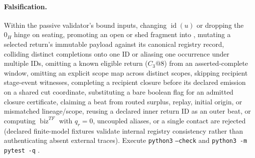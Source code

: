 \paragraph{Falsification.}
Within the passive validator's bound inputs, changing \(\operatorname{id}(u)\)
or dropping the \(0_H\) hinge on seating, promoting an open or shed fragment
into , mutating a selected return's
immutable payload against its canonical registry record, colliding distinct
completions onto one ID or aliasing one occurrence under multiple IDs, omitting
a known eligible return (\(C_3@8\)) from an asserted-complete window, omitting
an explicit scope map across distinct scopes, skipping recipient stage-event
witnesses, completing a recipient closure before its declared emission on a
shared cut coordinate, substituting a bare boolean flag for an admitted closure
certificate, claiming a beat from routed surplus, replay, initial origin, or
mismatched lineage/scope, reusing a declared inner return ID as an outer beat,
or computing \(\operatorname{biz}^{TF}\) with \(q_r=0\), uncoupled aliases, or
a single contact are rejected (declared finite-model fixtures validate internal
registry consistency rather than authenticating absent external traces). Execute
\texttt{python3} 
\texttt{--check} and \texttt{python3 -m pytest -q}
.


